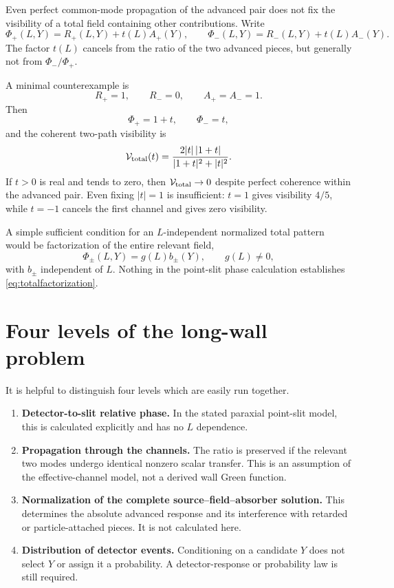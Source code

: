 \documentclass[11pt]{article}
\begin{document}
Even perfect common-mode propagation of the advanced pair does not fix the visibility of a total field containing other contributions.  Write
\begin{equation}
 \Phi_+(L,Y)=R_+(L,Y)+t(L)A_+(Y),
 \qquad
 \Phi_-(L,Y)=R_-(L,Y)+t(L)A_-(Y).
 \label{eq:totalfield}
\end{equation}
The factor $t(L)$ cancels from the ratio of the two advanced pieces, but generally not from $\Phi_-/\Phi_+$.

A minimal counterexample is
\begin{equation}
 R_+=1,
 \qquad R_-=0,
 \qquad A_+=A_-=1.
\end{equation}
Then
\begin{equation}
 \Phi_+=1+t,
 \qquad
 \Phi_-=t,
\end{equation}
and the coherent two-path visibility is
\begin{equation}
 \mathcal V_{\rm total}(t)
 =\frac{2|t|\,|1+t|}{|1+t|^2+|t|^2}.
 \label{eq:totalvisibility}
\end{equation}
If $t>0$ is real and tends to zero, then $\mathcal V_{\rm total}\to0$ despite perfect coherence within the advanced pair.  Even fixing $|t|=1$ is insufficient: $t=1$ gives visibility $4/5$, while $t=-1$ cancels the first channel and gives zero visibility.

A simple sufficient condition for an $L$-independent normalized total pattern would be factorization of the entire relevant field,
\begin{equation}
 \Phi_\pm(L,Y)=g(L)b_\pm(Y),
 \qquad g(L)\neq0,
 \label{eq:totalfactorization}
\end{equation}
with $b_\pm$ independent of $L$.  Nothing in the point-slit phase calculation establishes \eqref{eq:totalfactorization}.

\section{Four levels of the long-wall problem}

It is helpful to distinguish four levels which are easily run together.

\begin{enumerate}
\item \textbf{Detector-to-slit relative phase.}  In the stated paraxial point-slit model, this is calculated explicitly and has no $L$ dependence.
\item \textbf{Propagation through the channels.}  The ratio is preserved if the relevant two modes undergo identical nonzero scalar transfer.  This is an assumption of the effective-channel model, not a derived wall Green function.
\item \textbf{Normalization of the complete source--field--absorber solution.}  This determines the absolute advanced response and its interference with retarded or particle-attached pieces.  It is not calculated here.
\item \textbf{Distribution of detector events.}  Conditioning on a candidate $Y$ does not select $Y$ or assign it a probability.  A detector-response or probability law is still required.
\end{enumerate}
\end{document}
